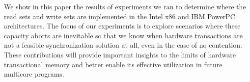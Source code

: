 We show in this paper the results of experiments we ran to determine where the
read sets and write sets are implemented in the Intel x86 and IBM PowerPC
architectures. The focus of our experiments is to explore scenarios where these
capacity aborts are inevitable so that we know when hardware transactions are
not a feasible synchronization solution at all, even in the case of no
contention. These contributions will provide important insights to the limits of
hardware transactional memory and better enable its effective utilization in
future multicore programs.
 
